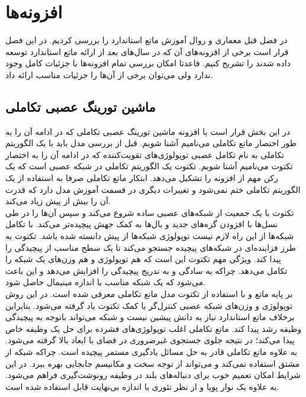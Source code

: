 \chapter{افزونه‌ها}
در فصل قبل معماری و روال آموزش ماتع استاندارد را بررسی کردیم. در این فصل قرار است برخی از افزونه‌های آن که در سال‌های بعد از ارائه ماتع استاندارد توسعه داده شدند را تشریح کنیم. فاعدتا امکان بررسی تمام افزونه‌ها با جزئیات کامل وجود ندارد ولی می‌توان برخی از آن‌ها را جزئیات مناسب ارائه داد.

\section{ماشین تورینگ عصبی تکاملی}
در این بخش قرار است با افزونه ماشین تورینگ عصبی تکاملی که در ادامه آن را به طور اختصار ماتع تکاملی می‌نامیم آشنا شویم. قبل از بررسی مدل باید با یک الگوریتم تکاملی به نام تکامل عصبی توپولوژی‌های تقویت‌کننده که در ادامه آن را به اختصار تکتوت می‌نامیم آشنا شویم. تکتوت یک الگوریتم تکاملی در شبکه عصبی است که یک رکن مهم از افزونه را تشکیل می‌دهد. ابتکار ماتع تکاملی صرفا به استفاده از یک الگوریتم تکاملی ختم نمی‌شود و تغییرات دیگری در قسمت آموزش مدل دارد که قدرت آن را بیش از پیش زیاد می‌کند. 
\\

 تکتوت با یک جمعیت از شبکه‌های عصبی ساده شروع می‌کند و سپس آن‌ها را در طی نسل‌ها با افزودن گره‌های جدید و بال‌ها به کمک جهش پیچیده‌تر می‌کند. با تکامل شبکه‌ها از این راه لازم نیست توپولوژی شبکه‌ها از پیش دانسته شده باشد. تکتوت به طرز فزاینده‌ای در شبکه‌های پیچیده جستجو می‌کند تا یک سطح مناسب از پیچیدگی را پیدا کند. ویژگی مهم تکتوت این است که هم توپولوژی و هم وزن‌های یک شبکه را تکامل می‌دهد. چراکه به سادگی و به تدریج پیچیدگی را افزایش می‌دهد و این باعث می‌شود که یک شبکه مناسب با اندازه مینیمال حاصل شود.\cite{merrild2018hyperntm}
\\

بر پایه ماتع و با استفاده از تکتوت مدل ماتع تکاملی معرفی شده است. در این روش توپولوژی و وزن‌های شبکه عصبی کنترل‌گر با کمک تکتوت یاد گرفته می‌شود. بنابراین برخلاف ماتع استاندارد نیاز به دانش پیشین نیست و شبکه می‌تواند باتوجه به پیچیدگی وظیفه رشد پیدا کند. ماتع تکاملی اغلب توپولوژی‌‌های فشرده برای حل یک وظیفه خاص پیدا می‌کند؛ در نتیجه جلوی جستجوی غیرضروری در فضای با ابعاد بالا گرفته می‌شود. به علاوه ماتع تکاملی قادر به حل مسائل یادگیری مستمر پیچیده است. چراکه شبکه از مشتق استفاده نمی‌کند و می‌تواند از توجه سخت و مکانیسم جابجایی بهره ببرد. در این شرایط امکان تعمیم خوب برای دنباله‌های بلند در وظیفه رونوشت‌گیری فراهم می‌شود. به علاوه یک نوار پویا و از نظر تئوری با اندازه بی‌نهایت قابل استفاده شده است.\cite{merrild2018hyperntm}
\\

